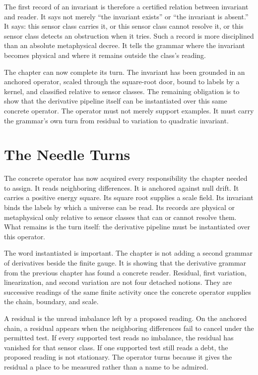 The first record of an invariant is therefore a certified relation between
invariant and reader. It says not merely ``the invariant exists'' or ``the
invariant is absent.'' It says: this sensor class carries it, or this sensor
class cannot resolve it, or this sensor class detects an obstruction when it
tries. Such a record is more disciplined than an absolute metaphysical
decree. It tells the grammar where the invariant becomes physical and where
it remains outside the class's reading.

The chapter can now complete its turn. The invariant has been grounded in an
anchored operator, scaled through the square-root door, bound to labels by a
kernel, and classified relative to sensor classes. The remaining obligation
is to show that the derivative pipeline itself can be instantiated over this
same concrete operator. The operator must not merely support examples. It
must carry the grammar's own turn from residual to variation to quadratic
invariant.

\section{The Needle Turns}

The concrete operator has now acquired every responsibility the chapter
needed to assign. It reads neighboring differences. It is anchored against
null drift. It carries a positive energy square. Its square root supplies a
scale field. Its invariant binds the labels by which a universe can be read.
Its records are physical or metaphysical only relative to sensor classes
that can or cannot resolve them. What remains is the turn itself: the
derivative pipeline must be instantiated over this operator.

The word instantiated is important. The chapter is not adding a second
grammar of derivatives beside the finite gauge. It is showing that the
derivative grammar from the previous chapter has found a concrete reader.
Residual, first variation, linearization, and second variation are not four
detached notions. They are successive readings of the same finite activity
once the concrete operator supplies the chain, boundary, and scale.

A residual is the unread imbalance left by a proposed reading. On the
anchored chain, a residual appears when the neighboring differences fail to
cancel under the permitted test. If every supported test reads no imbalance,
the residual has vanished for that sensor class. If one supported test
still reads a debt, the proposed reading is not stationary. The operator
turns because it gives the residual a place to be measured rather than a
name to be admired.

